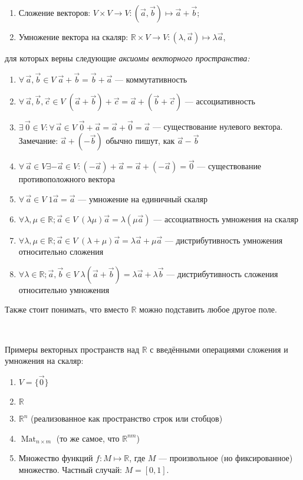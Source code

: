 \documentclass[a4paper, 12pt]{article}
\DeclareMathOperator{\Mat}{Mat}
\begin{document}
\begin{enumerate}
\item Сложение векторов: $V \times V \rightarrow V : (\vec{a},\vec{b}) \mapsto \vec{a}+\vec{b}$;
\item Умножение вектора на скаляр: $\mathbb{R} \times V \rightarrow V : (\lambda , \vec{a}) \mapsto \lambda\vec{a}$,
\end{enumerate}
для которых верны следующие \textit{аксиомы векторного пространства:}
\begin{enumerate}
\item $\forall\,\vec{a}, \vec{b} \in V\; \vec{a} + \vec{b} = \vec{b} + \vec{a}$ --- коммутативность
\item $\forall\,\vec{a}, \vec{b}, \vec{c} \in V\; (\vec{a} + \vec{b}) + \vec{c} = \vec{a} + (\vec{b} + \vec{c})$ --- ассоциативность
\item $\exists\,\vec{0} \in V : \forall\,\vec{a} \in V\; \vec{0} + \vec{a} = \vec{a} + \vec{0} = \vec{a}$ --- существование нулевого вектора. Замечание: $\vec{a} + (-\vec{b})$ обычно пишут, как $\vec{a} - \vec{b}$
\item $\forall\,\vec{a} \in V \exists -\vec{a} \in V : (-\vec{a}) + \vec{a} = \vec{a} + (-\vec{a}) = \vec{0}$ --- существование противоположного вектора
\item $\forall\,\vec{a} \in V\; 1\vec{a} = \vec{a}$ --- умножение на единичный скаляр
\item $\forall \lambda, \mu \in \mathbb{R}; \vec{a} \in V\; (\lambda\mu)\vec{a} = \lambda(\mu\vec{a})$ --- ассоциатвность умножения на скаляр
\item $\forall \lambda, \mu \in \mathbb{R}; \vec{a} \in V\; (\lambda + \mu)\vec{a} = \lambda\vec{a} + \mu\vec{a}$ --- дистрибутивность умножения относительно сложения
\item $\forall \lambda \in \mathbb{R}; \vec{a}, \vec{b} \in V\; \lambda(\vec{a} + \vec{b}) = \lambda \vec{a} + \lambda \vec{b}$ --- дистрибутивность сложения относительно умножения
\end{enumerate}

Также стоит понимать, что вместо $\mathbb{R}$ можно подставить любое другое поле.

\

Примеры векторных пространств над $\mathbb{R}$ с введёнными операциями сложения и умножения на скаляр:
\begin{enumerate}
\item $V = \{\vec{0}\}$ 
\item $\mathbb{R}$
\item $\mathbb{R}^n$ (реализованное как пространство строк или стобцов)
\item $\Mat_{n \times m}$ (то же самое, что $\mathbb{R}^{nm}$)
\item Множество функций $f: M \mapsto \mathbb{R}$, где $M$ --- произвольное (но фиксированное) множество.
Частный случай: $M = [0,1]$.
\end{enumerate}
\end{document}
